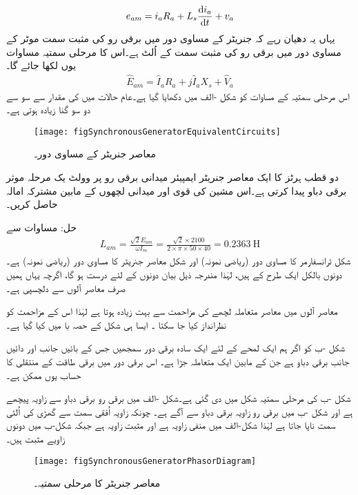 \begin{align}
e_{am}=i_a R_a+L_s \frac{\dif i_a}{\dif t}+v_a
\end{align}
یہاں یہ دھیان رہے کہ جنریٹر کے مساوی دور میں برقی رو کی مثبت سمت موٹر کے مساوی دور میں برقی رو کی مثبت سمت کے اُلٹ ہے۔اس کا مرحلی سمتیہ مساوات یوں لکھا جائے گا۔
\begin{align}\label{مساوات_معاصر_جنریٹر_دوری_سمتیہ_مساوات}
\hat{E}_{am}= \hat{I}_a R_a+j \hat{I}_a X_s +\hat{V}_a
\end{align}
اس مرحلی سمتیہ کے مساوات کو شکل -الف میں دکھایا گیا ہے۔عام حالات میں  کی مقدار   سے سو سے دو سو گنا زیادہ ہوتی ہے۔ 
\begin{figure}
\centering
\texttt{[image: figSynchronousGeneratorEquivalentCircuits]}
\caption{معاصر جنریٹر کے مساوی دور۔}
\label{شکل_معاصر_جنریٹر_کے_سادہ_مساوی_دور}
\end{figure}

دو قطب  ہرٹز کا ایک معاصر جنریٹر  ایمپیئر میدانی برقی رو پر   وولٹ یک مرحلہ موثر برقی دباو پیدا کرتی ہے۔اس مشین کی قوی اور میدانی لچھوں کے مابین مشترکہ امالہ حاصل کریں۔

	حل:
	مساوات   سے 
\begin{align}
L_{am}=\frac{\sqrt{2} E_{am}}{\omega I_m}=\frac{\sqrt{2}  \times 2100}{2 \times \pi \times 50 \times 40}=\SI{0.2363}{\henry}
\end{align}
%
شکل  ٹرانسفارمر کا مساوی دور (ریاضی نمونہ) اور شکل  معاصر جنریٹر کا مساوی دور (ریاضی نمونہ) ہے۔ دونوں بالکل ایک طرح کے ہیں، لہٰذا مندرجہ ذیل بیان دونوں کے لئے درست ہو گا، اگرچہ یہاں ہمیں صرف معاصر آلوں سے دلچسپی ہے۔

معاصر آلوں میں معاصر متعاملہ لچھے کی مزاحمت سے بہت زیادہ ہوتا ہے لہٰذا اس کے مزاحمت کو نظرانداز کیا جا سکتا ۔ ایسا ہی شکل کے حصہ با میں کیا گیا ہے۔

شکل -ب کو اگر ہم ایک لمحے کے لئے ایک سادہ برقی دور سمجھیں جس کے بائیں جانب  اور دائیں جانب  برقی دباو ہے جن کے مابین ایک متعاملہ  جڑا ہے۔ اس برقی دور میں برقی طاقت کے منتقلی کا حساب یوں ممکن ہے۔

 شکل -ب کی مرحلی سمتیہ شکل   میں دی گئی ہے۔شکل -الف میں  برقی رو  برقی دباو  سے   زاویہ  پیچھے  ہے اور شکل -ب میں برقی رو  زاویہ برقی دباو سے  آگے  ہے۔ چونکہ زاویہ اُفقی سمت سے گھڑی کی اُلٹی سمت ناپا جاتا ہے لہٰذا شکل-الف میں  منفی زاویہ ہے اور  مثبت زاویہ ہے جبکہ شکل-ب میں دونوں زاویے مثبت ہیں۔
\begin{figure}
\centering
\texttt{[image: figSynchronousGeneratorPhasorDiagram]}
\caption{معاصر جنریٹر کا مرحلی سمتیہ۔}
\label{شکل_معاصر_جنریٹر_دوری_سمتیہ}
\end{figure}

